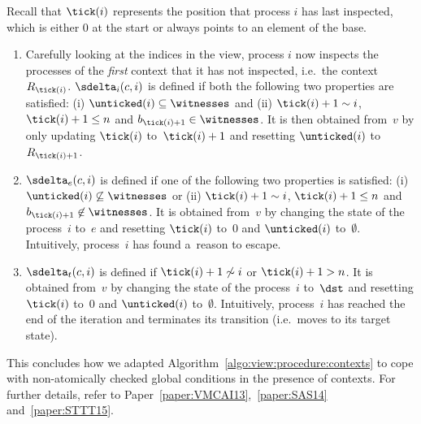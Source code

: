 Recall that $\tick(i)$ represents the position that process $i$ has
last inspected, which is either $0$ at the start or always points to
an element of the base.
%
%

%
\begin{enumerate}[label={(\alph{*})},leftmargin=0pt]
\item %
  Carefully looking at the indices in the view, process $i$ now
  inspects the processes of the \emph{first} context that it has not
  inspected, i.e.\ the context~$R_{\tick(i)}$.
  $\sdelta_i(c,i)$ is defined if both the following two properties are
  satisfied: %
  (i) $\unticked(i)\subseteq\witnesses$ and %
  (ii) $\tick(i)+1\sim i$, $\tick(i)+1 \leq n$ and
  $b_{\tick(i)+1}\in\witnesses$.
  It is then obtained from~$v$ by only
  updating $\tick(i)$ to~$\tick(i)+1$ and resetting $\unticked(i)$ to
  $R_{\tick(i)+1}$.
\item %
  $\sdelta_e(c,i)$ is defined if one of the following two properties
  is satisfied: %
  (i) $\unticked(i)\not\subseteq\witnesses$ or
  (ii) $\tick(i)+1\sim i$, $\tick(i)+1 \leq n$ and $b_{\tick(i)+1}\not\in\witnesses$.
  It is obtained from~$v$ by changing the state of the process~$i$
  to~$e$ and resetting $\tick(i)$ to~$0$ and $\unticked(i)$
  to~$\emptyset$. Intuitively, process~$i$ has found a~reason to
  escape.
\item %
  $\sdelta_t(c,i)$ is defined if $\tick(i)+1\not\sim i$ or $\tick(i)+1>n$.
  It is obtained from~$v$ by changing the state of the process~$i$
  to~$\dst$ and resetting $\tick(i)$ to~$0$ and $\unticked(i)$
  to~$\emptyset$. Intuitively, process~$i$ has reached the end of the
  iteration and terminates its transition (i.e.\ moves to its target
  state).
\end{enumerate}

\smallskip%
This concludes how we adapted
Algorithm~\ref{algo:view:procedure:contexts} to cope with
non-atomically checked global conditions in the presence of contexts.
%
For further details, refer to
Paper~\ref{paper:VMCAI13},~\ref{paper:SAS14} and~\ref{paper:STTT15}.
